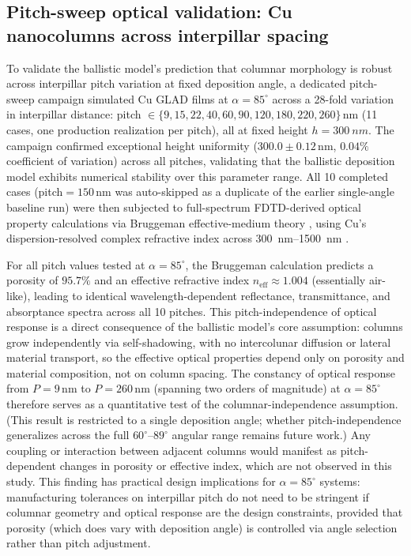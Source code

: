 \documentclass[aip,amsmath,amssymb,reprint]{revtex4-1}
\newcommand{\dang}{\ensuremath{\alpha}}
\begin{document}
\subsection{Pitch-sweep optical validation: Cu nanocolumns across interpillar spacing}
\label{ssec:cu_pitch_sweep_optical}

To validate the ballistic model's prediction that columnar morphology is
robust across interpillar pitch variation at fixed deposition angle, a
dedicated pitch-sweep campaign simulated Cu GLAD films at $\dang=85^{\circ}$
across a 28-fold variation in interpillar distance: pitch $\in
\{9, 15, 22, 40, 60, 90, 120, 180, 220, 260\}\,\mathrm{nm}$ (11 cases, one
production realization per pitch), all at fixed height $h=\SI{300}{nm}$.
The campaign confirmed exceptional height uniformity ($300.0 \pm 0.12\,\mathrm{nm}$,
$0.04\%$ coefficient of variation) across all pitches, validating that
the ballistic deposition model exhibits numerical stability over this
parameter range. All 10 completed cases (pitch$=150\,\mathrm{nm}$ was
auto-skipped as a duplicate of the earlier single-angle baseline run) were
then subjected to full-spectrum FDTD-derived optical property calculations
via Bruggeman effective-medium theory \citep{bruggeman1935}, using Cu's
dispersion-resolved complex refractive index across
\SIrange{300}{1500}{nm} \citep{palik1985}.

For all pitch values tested at $\dang=85^{\circ}$, the Bruggeman calculation predicts a porosity of
$95.7\%$ and an effective refractive index $n_{\mathrm{eff}} \approx 1.004$
(essentially air-like), leading to identical wavelength-dependent
reflectance, transmittance, and absorptance spectra across all 10 pitches.
This pitch-independence of optical response is a direct consequence of the
ballistic model's core assumption: columns grow independently via
self-shadowing, with no intercolunar diffusion or lateral material transport,
so the effective optical properties depend only on porosity and material
composition, not on column spacing. The constancy of optical response from
$P=9\,\mathrm{nm}$ to $P=260\,\mathrm{nm}$ (spanning two orders of magnitude)
at $\dang=85^{\circ}$ therefore serves as a quantitative test of the columnar-independence assumption.
(This result is restricted to a single deposition angle; whether pitch-independence
generalizes across the full $60^{\circ}$--$89^{\circ}$ angular range remains future work.)
Any coupling or interaction between adjacent columns would manifest as
pitch-dependent changes in porosity or effective index, which are not observed in this study.
This finding has practical design implications for $\dang=85^{\circ}$ systems: manufacturing tolerances on
interpillar pitch do not need to be stringent if columnar geometry and optical
response are the design constraints, provided that porosity (which does vary with
deposition angle) is controlled via angle selection rather than pitch adjustment.
\end{document}

